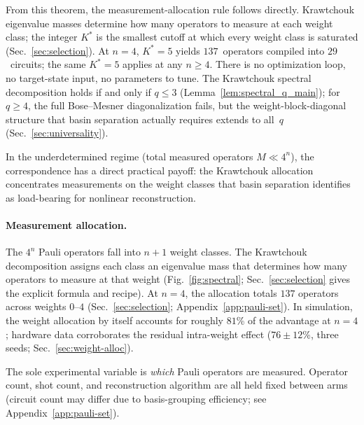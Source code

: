 \documentclass[twocolumn,prx,aps,superscriptaddress,longbibliography,floatfix]{revtex4-2}
\newcommand{\pclaim}[4]{}
\begin{document}
From this theorem, the measurement-allocation rule follows
directly.
Krawtchouk eigenvalue masses determine how many operators to
measure at each weight class; the integer $K^*$ is the smallest
cutoff at which every weight class is saturated
(Sec.~\ref{sec:selection}).
At $n = 4$, $K^* = 5$ yields $137$~operators compiled into
$29$~circuits; the same $K^* = 5$ applies at any $n \ge 4$.
There is no optimization loop, no target-state input, no
parameters to tune.
\pclaim{prose:intro:iff}{proved}{*}{lem:spectral_q_main}%
The Krawtchouk spectral decomposition holds if and only if $q \le 3$
(Lemma~\ref{lem:spectral_q_main}); for $q \ge 4$, the full
Bose--Mesner diagonalization fails, but the weight-block-diagonal
structure that basin separation actually requires extends to
all~$q$ (Sec.~\ref{sec:universality}).

In the underdetermined regime (total measured operators
$M \ll 4^n$), the
correspondence has a direct practical payoff: the
Krawtchouk allocation concentrates measurements on the
weight classes that basin separation identifies as
load-bearing for nonlinear reconstruction.

\paragraph{Measurement allocation.}
The $4^n$ Pauli operators fall into $n+1$ weight classes.
The Krawtchouk decomposition assigns each class an eigenvalue
mass that determines how many operators to measure at that
weight (Fig.~\ref{fig:spectral};
Sec.~\ref{sec:selection} gives the explicit formula and recipe).
At $n = 4$, the allocation totals $137$ operators
across weights $0$--$4$ (Sec.~\ref{sec:selection};
Appendix~\ref{app:pauli-set}).
In simulation, the weight allocation by itself accounts for
roughly $81$\% of the advantage at $n = 4$; hardware data
corroborates the residual intra-weight effect
($76 \pm 12$\%, three seeds; Sec.~\ref{sec:weight-alloc}).

The sole experimental variable is \emph{which} Pauli operators
are measured.  Operator count, shot count, and reconstruction
algorithm are all held fixed between arms (circuit count may
differ due to basis-grouping efficiency; see
Appendix~\ref{app:pauli-set}).
\end{document}
